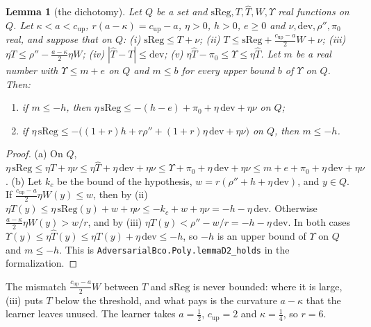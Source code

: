 \documentclass[11pt]{amsart}
\newtheorem{lemma}[theorem]{Lemma}
\theoremstyle{definition}
\numberwithin{equation}{section}
\begin{document}
\begin{lemma}[the dichotomy]\label{lem:d2}
Let $Q$ be a set and $\mathrm{sReg},T,\hat T,W,\Upsilon$ real functions on $Q$. Let $\kappa<a<c_{\mathrm{up}}$, $r(a-\kappa)=c_{\mathrm{up}}-a$, $\eta>0$, $h>0$, $e\ge0$ and $\nu,\mathrm{dev},\rho'',\pi_0$ real, and suppose that on $Q$: (i) $\mathrm{sReg}\le T+\nu$; (ii) $T\le\mathrm{sReg}+\frac{c_{\mathrm{up}}-a}2W+\nu$; (iii) $\eta T\le\rho''-\frac{a-\kappa}2\eta W$; (iv) $|\hat T-T|\le\mathrm{dev}$; (v) $\eta\hat T-\pi_0\le\Upsilon\le\eta\hat T$. Let $m$ be a real number with $\Upsilon\le m+e$ on $Q$ and $m\le b$ for every upper bound $b$ of $\Upsilon$ on $Q$. Then:
\begin{enumerate}[label=(\alph*)]
\item if $m\le-h$, then $\eta\,\mathrm{sReg}\le-(h-e)+\pi_0+\eta\,\mathrm{dev}+\eta\nu$ on $Q$;
\item if $\eta\,\mathrm{sReg}\le-\bigl((1+r)h+r\rho''+(1+r)\eta\,\mathrm{dev}+\eta\nu\bigr)$ on $Q$, then $m\le-h$.
\end{enumerate}
\end{lemma}

\begin{proof}
(a) On $Q$, $\eta\,\mathrm{sReg}\le\eta T+\eta\nu\le\eta\hat T+\eta\,\mathrm{dev}+\eta\nu\le\Upsilon+\pi_0+\eta\,\mathrm{dev}+\eta\nu\le m+e+\pi_0+\eta\,\mathrm{dev}+\eta\nu$. (b) Let $k_c$ be the bound of the hypothesis, $w=r(\rho''+h+\eta\,\mathrm{dev})$, and $y\in Q$. If $\frac{c_{\mathrm{up}}-a}2\eta W(y)\le w$, then by (ii) $\eta T(y)\le\eta\,\mathrm{sReg}(y)+w+\eta\nu\le-k_c+w+\eta\nu=-h-\eta\,\mathrm{dev}$. Otherwise $\frac{a-\kappa}2\eta W(y)>w/r$, and by (iii) $\eta T(y)<\rho''-w/r=-h-\eta\,\mathrm{dev}$. In both cases $\Upsilon(y)\le\eta\hat T(y)\le\eta T(y)+\eta\,\mathrm{dev}\le-h$, so $-h$ is an upper bound of $\Upsilon$ on $Q$ and $m\le-h$.
This is \texttt{AdversarialBco.Poly.lemmaD2\_holds} in the formalization.
\end{proof}

The mismatch $\frac{c_{\mathrm{up}}-a}2W$ between $T$ and $\mathrm{sReg}$ is never bounded: where it is large, (iii) puts $T$ below the threshold, and what pays is the curvature $a-\kappa$ that the learner leaves unused. The learner takes $a=\frac12$, $c_{\mathrm{up}}=2$ and $\kappa=\frac14$, so $r=6$.
\end{document}
